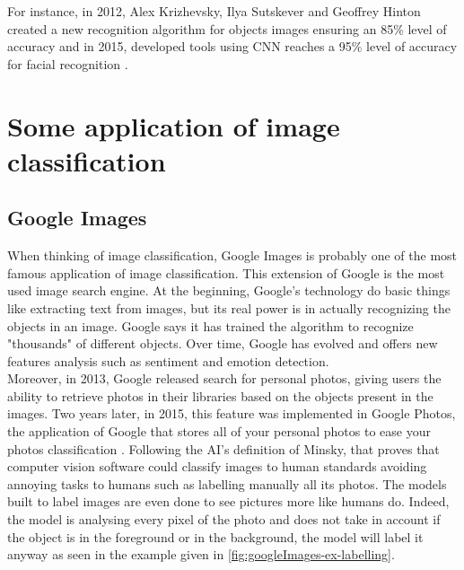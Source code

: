\documentclass[11pt, openany]{report}
\theoremstyle{plain}
\theoremstyle{definition}
\theoremstyle{remark}
\begin{document}
For instance, in 2012, Alex Krizhevsky, Ilya Sutskever and Geoffrey Hinton created a new recognition algorithm for objects images ensuring an 85\% level of accuracy and in 2015, developed tools using CNN reaches a 95\% level of accuracy for facial recognition \cite{History-1}. \\  

\section{Some application of image classification}

\subsection{Google Images}
When thinking of image classification, Google Images is probably one of the most famous application of image classification. This extension of Google is the most used image search engine. At the beginning, Google's technology do basic things like extracting text from images, but its real power is in actually recognizing the objects in an image. Google says it has trained the algorithm to recognize "thousands" of different objects. %
Over time, Google has evolved and offers new features analysis such as sentiment and emotion detection. \\

Moreover, in 2013, Google released search for personal photos, giving users the ability to retrieve photos in their libraries based on the objects present in the images. Two years later, in 2015, this feature was implemented in Google Photos, the application of Google that stores all of your personal photos to ease your photos classification \cite{Google-2}. Following the AI's definition of Minsky, that proves that computer vision software could classify images to human standards avoiding annoying tasks to humans such as labelling manually all its photos. The models built to label images are even done to see pictures more like humans do. Indeed, the model is analysing every pixel of the photo and does not take in account if the object is in the foreground or in the background, the model will label it anyway as seen in the example given in \autoref{fig:googleImages-ex-labelling}. 
\end{document}
